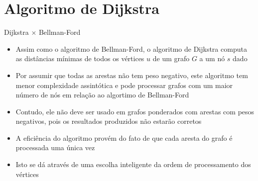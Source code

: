 \section{Algoritmo de Dijkstra}

\begin{frame}[fragile]{Dijkstra $\times$ Bellman-Ford}

    \begin{itemize}
        \item Assim como o algoritmo de Bellman-Ford, o algoritmo de Dijkstra computa as
            distâncias mínimas de todos os vértices $u$ de um grafo $G$ a um nó $s$ dado

        \item Por assumir que todas as arestas não tem peso negativo, este algoritmo tem
            menor complexidade assintótica e pode processar grafos com um maior número de
            nós em relação ao algortimo de Bellman-Ford

        \item Contudo, ele não deve ser usado em grafos ponderados com arestas com pesos
            negativos, pois os resultados produzidos não estarão corretos

        \item A eficiência do algoritmo provém do fato de que cada aresta do grafo é
            processada uma única vez

        \item Isto se dá através de uma escolha inteligente da ordem de processamento dos
            vértices
    \end{itemize}

\end{frame}

